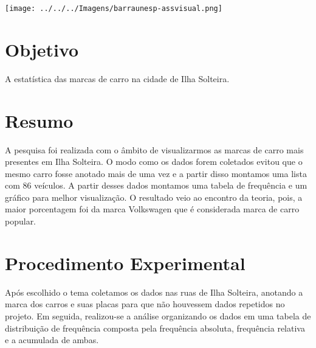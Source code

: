 \documentclass[
	12pt,				%
	oneside,			%
	a4paper,			%
	english,			%
	french,				%
	spanish,			%
	brazil,				%
	]{abntex2}
\begin{document}
\begin{minipage}[c][1.5cm][c]{3cm} %

\texttt{[image: ../../../Imagens/barraunesp-assvisual.png]} 

\end{minipage}


\frenchspacing 


\imprimircapa

\imprimirfolhaderosto*

\tableofcontents*
\newpage

\section[Objetivo]{Objetivo}
\pagestyle{fancy}

A estatística das marcas de carro na cidade de Ilha Solteira.

\newpage
\section[Resumo]{Resumo}

A pesquisa foi realizada com o âmbito de visualizarmos as marcas de carro mais presentes em Ilha Solteira.  O modo como os dados forem coletados evitou que o mesmo carro fosse anotado mais de uma vez e a partir disso montamos uma lista com 86 veículos. A partir desses dados montamos uma tabela de frequência e um gráfico para melhor visualização. O resultado veio ao encontro da teoria, pois, a maior porcentagem foi da marca Volkswagen que é considerada marca de carro popular.  


\newpage
\section[Procedimento Experimental]{Procedimento Experimental}

Após escolhido o tema coletamos os dados nas ruas de Ilha Solteira, anotando a marca dos carros e suas placas para que não houvessem dados repetidos no projeto. Em seguida, realizou-se a análise organizando os dados em uma tabela de distribuição de frequência composta pela frequência absoluta, frequência relativa e a acumulada de ambas.
\end{document}
